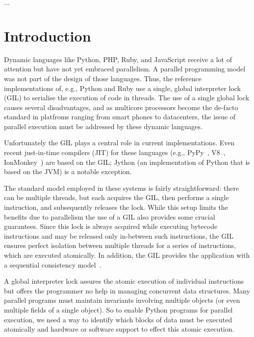\documentclass{sigplanconf}
\begin{document}


\keywords
...

\section{Introduction}


Dynamic languages like Python, PHP, Ruby, and JavaScript receive a lot of attention but
have not yet embraced parallelism. A parallel programming model was not part of the design
of those languages. Thus, the reference implementations of, e.g., Python and Ruby use a
single, global interpreter lock (GIL) to serialise the execution of code in threads. The
use of a single global lock causes several disadvantages, and as multicore processors
become the de-facto standard in platfroms ranging from smart phones to datacenters, the
issue of parallel execution must be addressed by these dynamic languages.

Unfortunately the GIL plays a central role in current implementations. Even
recent just-in-time compilers (JIT) for these languages
(e.g., PyPy~\cite{cfbolz09}, V8~\cite{kevin10}, IonMonkey~\cite{ionmonkey})
are based on the GIL; Jython (an implementation of Python that is based on the JVM) is a
notable exception.

The standard model employed in these systems is fairly straightforward: there can be
multiple threads, but each acquires the GIL, then performs a single instruction, and
subsequently releases the lock.
While this setup limits the benefits due to parallelism
the use of a GIL also provides some crucial guarantees. Since this lock is always acquired
while executing bytecode instructions and may be released only in-between such
instructions, the GIL ensures perfect isolation between multiple threads for a series of
instructions, which are executed atomically.  In addition, the GIL provides the
application with a sequential consistency model~\cite{lamport79}.

A global interpreter lock assures the atomic execution of individual instructions but
offers the programmer no help in managing concurrent data structures. Many parallel
programs must maintain invariants involving multiple objects (or even multiple fields of a
single object).  So to enable Python programs for parallel execution, we need a way to
identify which blocks of data must be executed atomically and hardware or software support
to effect this atomic execution.
\end{document}
